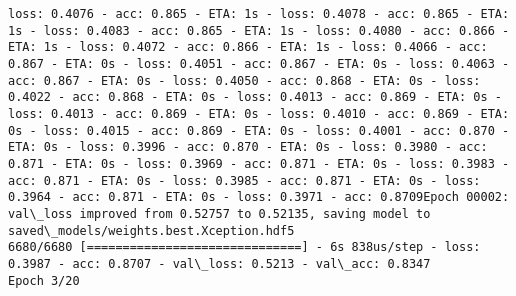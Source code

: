 \documentclass[11pt]{article}
\begin{document}
\begin{Verbatim}[commandchars=\\\{\}]
loss: 0.4076 - acc: 0.865 - ETA: 1s - loss: 0.4078 - acc: 0.865 - ETA: 1s - loss: 0.4083 - acc: 0.865 - ETA: 1s - loss: 0.4080 - acc: 0.866 - ETA: 1s - loss: 0.4072 - acc: 0.866 - ETA: 1s - loss: 0.4066 - acc: 0.867 - ETA: 0s - loss: 0.4051 - acc: 0.867 - ETA: 0s - loss: 0.4063 - acc: 0.867 - ETA: 0s - loss: 0.4050 - acc: 0.868 - ETA: 0s - loss: 0.4022 - acc: 0.868 - ETA: 0s - loss: 0.4013 - acc: 0.869 - ETA: 0s - loss: 0.4013 - acc: 0.869 - ETA: 0s - loss: 0.4010 - acc: 0.869 - ETA: 0s - loss: 0.4015 - acc: 0.869 - ETA: 0s - loss: 0.4001 - acc: 0.870 - ETA: 0s - loss: 0.3996 - acc: 0.870 - ETA: 0s - loss: 0.3980 - acc: 0.871 - ETA: 0s - loss: 0.3969 - acc: 0.871 - ETA: 0s - loss: 0.3983 - acc: 0.871 - ETA: 0s - loss: 0.3985 - acc: 0.871 - ETA: 0s - loss: 0.3964 - acc: 0.871 - ETA: 0s - loss: 0.3971 - acc: 0.8709Epoch 00002: val\_loss improved from 0.52757 to 0.52135, saving model to saved\_models/weights.best.Xception.hdf5
6680/6680 [==============================] - 6s 838us/step - loss: 0.3987 - acc: 0.8707 - val\_loss: 0.5213 - val\_acc: 0.8347
Epoch 3/20

\end{Verbatim}
\end{document}
